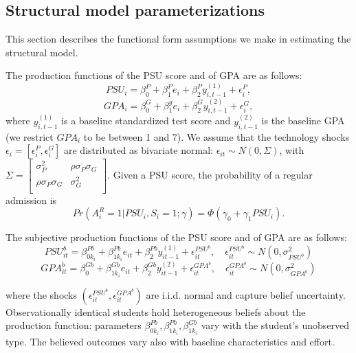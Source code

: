 \subsection{Structural model parameterizations}\label{sec:parameterization}
This section describes the functional form assumptions we make in estimating the structural model.\par 
The production functions of the PSU score and of GPA are as follows:
\begin{equation}
    PSU_i=\beta_0^P+\beta_1^P e_i +\beta_2^P y_{i,t-1}^{(1)}+\epsilon_{i}^P,
\end{equation}
\begin{equation}
    GPA_i=\beta_0^G+\beta_1^g e_i +\beta_2^G y_{i,t-1}^{(2)}+\epsilon_{i}^G,
\end{equation}
\noindent where $y_{i,t-1}^{(1)}$ is a baseline standardized test score and $y_{i,t-1}^{(2)}$ is the baseline GPA (we restrict $GPA_i$ to be between 1 and 7). We assume that the technology shocks $\epsilon_i=[ \epsilon_i^P,\epsilon_i^G]$ are distributed as bivariate normal: $\epsilon_{it}\sim N(0,\Sigma)$, with $\Sigma=\begin{bmatrix}
	\sigma^{2}_{P} & \rho\sigma_{P}\sigma_{G}   \\
	\rho\sigma_{P}\sigma_{G}  & \sigma^{2}_{G} \\
\end{bmatrix}$. Given a PSU score, the probability of a regular admission is 
\begin{equation}\label{eq:regular_admission}
    Pr(A^R_i=1|PSU_i,S_i=1;\gamma)= \Phi(\gamma_0 + \gamma_1 PSU_i).
\end{equation}

The subjective production functions of the PSU score and of GPA are as follows:
\begin{equation}\label{eq:rescalePSUb}
	PSU^b_{it}=\beta^{Pb}_{0k_i}+\beta^{Pb}_{1k_i} e_{it} +\beta^{Pb}_2 y^{(1)}_{it-1}+\epsilon^{PSU^b}_{it}, \quad \epsilon_{it}^{PSU^b}\sim N(0,\sigma^{2}_{PSU^b})
\end{equation}
\begin{equation}\label{eq:rescaleGPAb}
	GPA^b_{it}=\beta^{Gb}_{0}+\beta^{Gb}_{1k_i} e_{it} +\beta^{Gb}_2 y^{(2)}_{it-1}+\epsilon^{GPA^b}_{it}, \quad \epsilon_{it}^{GPA^b}\sim N(0,\sigma^{2}_{GPA^b})
\end{equation}

\noindent where the shocks $(\epsilon^{PSU^b}_{it},\epsilon^{GPA^b}_{it}) $ are i.i.d. normal and capture belief uncertainty. Observationally identical students hold heterogeneous beliefs about the production function: parameters $\beta^{Pb}_{0k_i},\beta^{Pb}_{1k_i}, \beta^{Gb}_{1k_i}$ vary with the student's unobserved type. The believed outcomes vary also with baseline characteristics and effort.\par 

